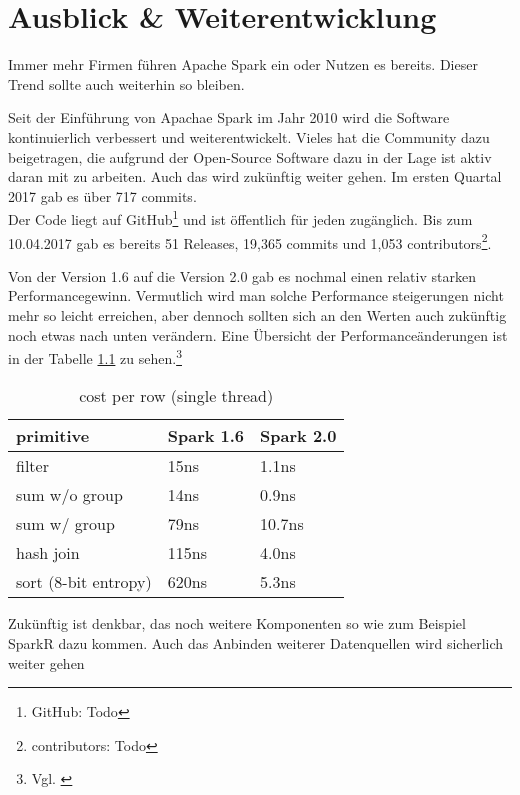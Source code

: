 \newpage
\chapter{Ausblick \& Weiterentwicklung} 

Immer mehr Firmen führen Apache Spark ein oder Nutzen es bereits. Dieser Trend sollte auch weiterhin so bleiben. 


\noindent
Seit der Einführung von Apachae Spark im Jahr 2010 wird die Software kontinuierlich verbessert und weiterentwickelt. Vieles hat die Community dazu beigetragen, die aufgrund der Open-Source Software dazu in der Lage ist aktiv daran mit zu arbeiten. Auch das wird zukünftig weiter gehen. Im ersten Quartal 2017 gab es über 717 commits.\\
Der Code liegt auf GitHub\footnote{GitHub: Todo } und ist öffentlich für jeden zugänglich. 
Bis zum 10.04.2017 gab es bereits 51 Releases, 19,365 commits und 1,053 contributors\footnote{contributors: Todo }.

\noindent
Von der Version 1.6 auf die Version 2.0 gab es nochmal einen relativ starken Performancegewinn. Vermutlich wird man solche Performance steigerungen nicht mehr so leicht erreichen, aber dennoch sollten sich an den Werten auch zukünftig noch etwas nach unten verändern. Eine Übersicht der Performanceänderungen ist in der Tabelle \ref{tab:spark_2_0} zu sehen.\footnote{Vgl. \cite{DATABRICK_SPARK_2_0}}


\begin{table}[h]
  \centering
		
		  \begin{tabular}[t]{|l|l|l|}
    \hline
		
		\rowcolor[gray]{.9}
		
				primitive	 & Spark 1.6 &  Spark 2.0 \\ \hline				
				filter &	15ns &	1.1ns \\ \hline				
				sum w/o group &	14ns &	0.9ns \\ \hline				
				sum w/ group &	79ns &	10.7ns \\ \hline				
				hash join	& 115ns	& 4.0ns \\ \hline				
				sort (8-bit entropy)	& 620ns	 & 5.3ns \\ \hline				

  \end{tabular}
		
  \caption{cost per row (single thread)}\label{tab:spark_2_0}
\end{table}



\noindent
Zukünftig ist denkbar, das noch weitere Komponenten so wie zum Beispiel SparkR dazu kommen. Auch das Anbinden weiterer Datenquellen wird sicherlich weiter gehen